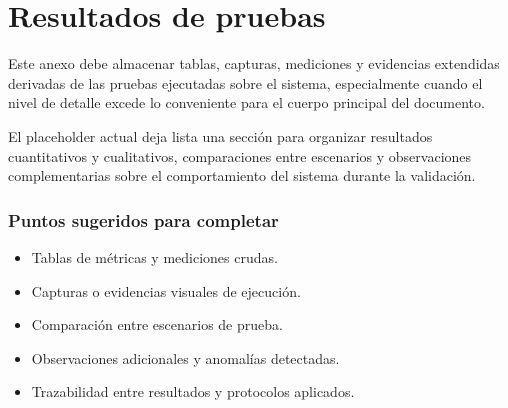 \chapter{Resultados de pruebas}

Este anexo debe almacenar tablas, capturas, mediciones y evidencias extendidas derivadas
de las pruebas ejecutadas sobre el sistema, especialmente cuando el nivel de detalle excede
lo conveniente para el cuerpo principal del documento.

El placeholder actual deja lista una sección para organizar resultados cuantitativos y
cualitativos, comparaciones entre escenarios y observaciones complementarias sobre el
comportamiento del sistema durante la validación.

\subsection*{Puntos sugeridos para completar}
\begin{itemize}[leftmargin=*]
  \item Tablas de métricas y mediciones crudas.
  \item Capturas o evidencias visuales de ejecución.
  \item Comparación entre escenarios de prueba.
  \item Observaciones adicionales y anomalías detectadas.
  \item Trazabilidad entre resultados y protocolos aplicados.
\end{itemize}

